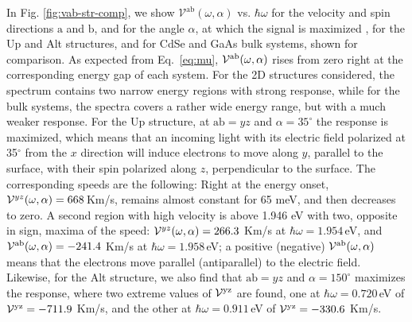 \documentclass[floatfix,prb,aps,superscriptaddress,showpacs,11pt,preprint,letterpaper]{revtex4}
\begin{document}
In Fig. \ref{fig:vab-str-comp}, we show $\mathcal{V}^{\mathrm{ab}}
(\omega,\alpha)$ vs. $\hbar\omega$ for the {\color{blue}velocity and spin
directions} $\mathrm{a}$ and $\mathrm{b}$, and for the angle $\alpha$, at which
the signal is maximized , for the Up  and Alt structures, and for CdSe and GaAs
bulk systems, shown for comparison. As expected from Eq.~\eqref{eq:mu}, ${\cal
V}^{\mathrm{a}\mathrm{b}}(\omega,\alpha)$ rises from zero right at the
corresponding energy gap of each system. For the 2D structures considered, the
spectrum contains two narrow energy regions with strong response, while for the
bulk systems, the spectra covers a rather wide energy range, but with a much
weaker response. For the Up structure, at $\mathrm{a}\mathrm{b}=yz$ and
$\alpha=35^\circ$ the response is maximized, which means that an incoming light
with its electric field polarized at 35$^\circ$ from the $x$ direction will
induce electrons to move along $y$, parallel to the surface, with their spin
polarized along $z$, perpendicular to the surface. The corresponding speeds
are the following: Right at the energy onset, ${\cal
V}^{yz}(\omega,\alpha)=668$\,Km/s, remains almost constant for 65 meV, and then
decreases to zero. A second region with high velocity is above 1.946 eV with
two, opposite in sign, maxima of the speed: ${\cal
V}^{yz}(\omega,\alpha)=266.3$ Km/s at $\hbar\omega=1.954$\,eV, and ${\cal
V}^{\mathrm{a}\mathrm{b}}(\omega,\alpha)=-241.4$ Km/s at
$\hbar\omega=1.958$\,eV; a positive (negative) ${\cal
V}^{\mathrm{a}\mathrm{b}}(\omega,\alpha)$ means that the electrons move
parallel (antiparallel) to the electric field. Likewise, for the Alt structure,
we also find that $\mathrm{a}\mathrm{b}=yz$ and $\alpha=150^\circ$ maximizes
the response, where two extreme values of ${\cal V}^{\mathrm{y}\mathrm{z}}$ are
found, one at  $\hbar\omega=0.720$\,eV of ${\cal
V}^{\mathrm{y}\mathrm{z}}=-711.9$ Km/s, and the other at
$\hbar\omega=0.911$\,eV of ${\cal V}^{\mathrm{y}\mathrm{z}}=-330.6$ Km/s.
 
\end{document}
